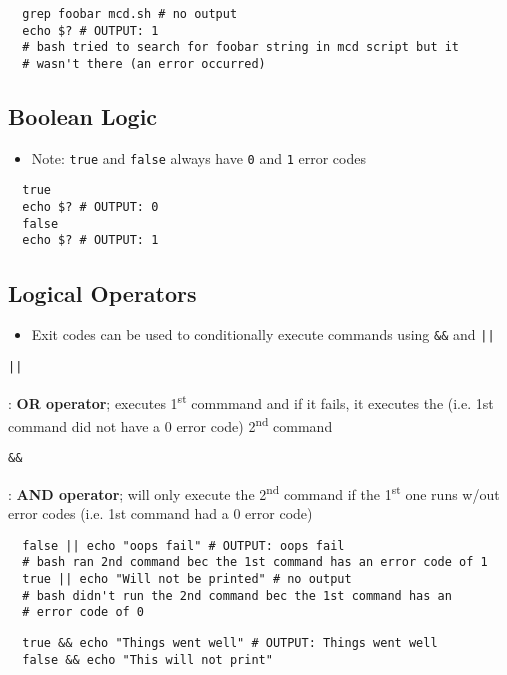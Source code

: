 \documentclass[letterpaper,12pt]{article}
\newcommand*{\lstitem}[1]{
  \setbox0\hbox{\lstinline{#1}}
  \item[\usebox0]
}
\begin{document}
\begin{lstlisting}
  grep foobar mcd.sh # no output
  echo $? # OUTPUT: 1
  # bash tried to search for foobar string in mcd script but it
  # wasn't there (an error occurred)
\end{lstlisting}

\subsection{Boolean Logic}

\begin{itemize}
 \item Note: \lstinline{true} and \lstinline{false} always have \lstinline{0} and \lstinline{1} error codes
\end{itemize}

\begin{lstlisting}
  true
  echo $? # OUTPUT: 0
  false
  echo $? # OUTPUT: 1
\end{lstlisting}

\subsection{Logical Operators}
\begin{itemize}
 \item Exit codes can be used to conditionally execute commands using \lstinline{&&} and \lstinline{||}
\end{itemize}

\begin{description}
 \lstitem{||}: \textbf{OR operator}; executes 1\textsuperscript{st} commmand and if it fails, it executes the (i.e. 1st command did not have a 0 error code) 2\textsuperscript{nd} command
 \lstitem{&&}: \textbf{AND operator}; will only execute the 2\textsuperscript{nd} command if the 1\textsuperscript{st} one runs w/out error codes (i.e. 1st command had a 0 error code)
\end{description}

\begin{lstlisting}
  false || echo "oops fail" # OUTPUT: oops fail
  # bash ran 2nd command bec the 1st command has an error code of 1
  true || echo "Will not be printed" # no output
  # bash didn't run the 2nd command bec the 1st command has an
  # error code of 0
\end{lstlisting}

\begin{lstlisting}
  true && echo "Things went well" # OUTPUT: Things went well
  false && echo "This will not print"
\end{lstlisting}
\end{document}
